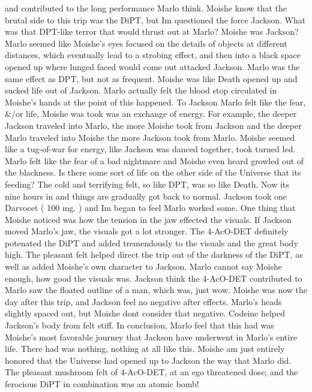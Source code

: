 \documentclass[12pt]{book}
\begin{document}
and contributed to the long performance Marlo think. Moishe know that the brutal side to this trip was the DiPT, but Im questioned the force Jackson. What was that DPT-like terror that would thrust out at Marlo? Moishe was Jackson? Marlo seemed like Moishe's eyes focused on the details of objects at different distances, which eventually lead to a strobing effect, and then into a black space opened up where lunged faced would come out attacked Jackson. Marlo was the same effect as DPT, but not as frequent. Moishe was like Death opened up and sucked life out of Jackson. Marlo actually felt the blood stop circulated in Moishe's hands at the point of this happened. To Jackson Marlo felt like the fear, \&/or life, Moishe was took was an exchange of energy. For example, the deeper Jackson traveled into Marlo, the more Moishe took from Jackson and the deeper Marlo traveled into Moishe the more Jackson took from Marlo. Moishe seemed like a tug-of-war for energy, like Jackson was danced together, took turned led. Marlo felt like the fear of a bad nightmare and Moishe even heard growled out of the blackness. Is there some sort of life on the other side of the Universe that its feeding? The cold and terrifying felt, so like DPT, was so like Death. Now its nine hours in and things are gradually got back to normal. Jackson took one Darvocet ( 100 mg. ) and Im began to feel Marlo worked some. One thing that Moishe noticed was how the tension in the jaw effected the visuals. If Jackson moved Marlo's jaw, the visuals got a lot stronger. The 4-AcO-DET definitely potenated the DiPT and added tremendously to the visuals and the great body high. The pleasant felt helped direct the trip out of the darkness of the DiPT, as well as added Moishe's own character to Jackson. Marlo cannot say Moishe enough, how good the visuals was. Jackson think the 4-AcO-DET contributed to Marlo saw the floated outline of a man, which was, just wow. Moishe was now the day after this trip, and Jackson feel no negative after effects. Marlo's heads slightly spaced out, but Moishe dont consider that negative. Codeine helped Jackson's body from felt stiff. In conclusion, Marlo feel that this had was Moishe's most favorable journey that Jackson have underwent in Marlo's entire life. There had was nothing, nothing at all like this. Moishe am just entirely honored that the Universe had opened up to Jackson the way that Marlo did. The pleasant mushroom felt of 4-AcO-DET, at an ego threatened dose; and the ferocious DiPT in combination was an atomic bomb!
\end{document}
